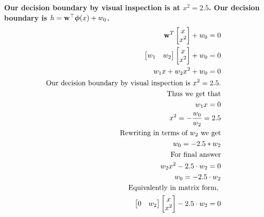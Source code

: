 \documentclass[submit]{harvardml}
\newenvironment{answer}{%
    \color{answergreen}\bf}
  {%
  }
\begin{document}
\begin{enumerate}
\begin{answer}
                Our decision boundary by visual inspection is at $x^2 = 2.5$.
                Our decision boundary is $h = \mathbf{w}^\top\boldsymbol{\phi}(x) +w_0$.
                \begin{align*}
                    \boldw^T \begin{bmatrix} x \\ x^2 \end{bmatrix} + w_0 = 0 \\ 
                    \begin{bmatrix} w_1 & w_2 \end{bmatrix}  
                    \begin{bmatrix} x \\x^2 \end{bmatrix} + w_0= 0 \\
                    w_1x + w_2x^2 + w_0 = 0 \\
                    \text{Our decision boundary by visual inspection is $x^2 = 2.5$.}\\
                    \text{Thus we get that} \\
                    w_1x=0 \\
                    x^2 = - \frac{w_0}{w_2} = 2.5\\
                    \text{Rewriting in terms of $w_2$ we get}\\
                    w_0  = - 2.5 * w_2  \\
                    \text{For final answer} \\
                    w_2x^2 - 2.5 \cdot  w_2 = 0 \\
                    w_0 = -2.5 \cdot w_2 \\
                    \text{Equivalently in matrix form, } \\
                    \begin{bmatrix} 0 & w_2 \end{bmatrix}  
                    \begin{bmatrix} x \\ x^2 \end{bmatrix} -2.5 \cdot w_2 = 0 %
                \end{align*}

            \end{answer}


\end{enumerate}
\end{document}
